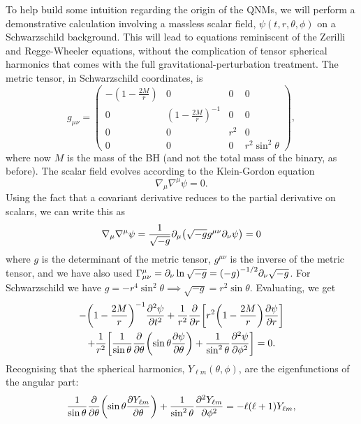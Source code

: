 To help build some intuition regarding the origin of the QNMs, we will perform a demonstrative calculation involving a massless scalar field, $\psi(t,r,\theta,\phi)$ on a Schwarzschild background.
This will lead to equations reminiscent of the Zerilli and Regge-Wheeler equations, without the complication of tensor spherical harmonics that comes with the full gravitational-perturbation treatment.
The metric tensor, in Schwarzschild coordinates, is
\begin{equation}
g_{\mu\nu} = \begin{pmatrix}
- \left(1 - \frac{2M}{r}\right) & 0 & 0 & 0 \\
0 & \left(1 - \frac{2M}{r}\right)^{-1} & 0 & 0 \\
0 & 0 & r^2 & 0 \\
0 & 0 & 0 & r^2 \sin^2\theta
\end{pmatrix},
\end{equation}
where now $M$ is the mass of the BH (and not the total mass of the binary, as before). 
The scalar field evolves according to the Klein-Gordon equation 
\begin{equation}
    \nabla_\mu \nabla^\mu \psi = 0.
\end{equation}
Using the fact that a covariant derivative reduces to the partial derivative on scalars, we can write this as
\begin{equation}
    \nabla_\mu \nabla^\mu \psi = \frac{1}{\sqrt{-g}} \partial_\mu \qty(\sqrt{-g} g^{\mu\nu} \partial_\nu \psi) = 0
\end{equation}
where $g$ is the determinant of the metric tensor, $g^{\mu\nu}$ is the inverse of the metric tensor, and we have also used $\Gamma^\mu_{\mu\nu} = \partial_\nu \ln{\sqrt{-g}} = \qty(-g)^{-1/2} \partial_\nu \sqrt{-g}$.
For Schwarzschild we have $g = -r^4 \sin^2{\theta} \implies \sqrt{-g} = r^2 \sin{\theta}$.
Evaluating, we get
\begin{multline}
    - \qty(1 - \frac{2M}{r})^{-1} \pdv[2]{\psi}{t} + \frac{1}{r^2} \pdv{r} \qty[r^2 \qty(1 - \frac{2M}{r}) \pdv{\psi}{r} ]\\
    + \frac{1}{r^2} \qty[ \frac{1}{\sin{\theta}} \pdv{\theta} \qty(\sin{\theta} \pdv{\psi}{\theta} ) + \frac{1}{\sin^2{\theta}} \pdv[2]{\psi}{\phi} ] = 0.
\end{multline}
Recognising that the spherical harmonics, $Y_{\ell m}(\theta,\phi)$, are the eigenfunctions of the angular part:
\begin{equation}
    \frac{1}{\sin{\theta}} \pdv{\theta} \qty(\sin{\theta} \pdv{Y_{\ell m}}{\theta} ) + \frac{1}{\sin^2{\theta}} \pdv[2]{Y_{\ell m}}{\phi} = - \ell (\ell + 1) Y_{\ell m},
\end{equation}
